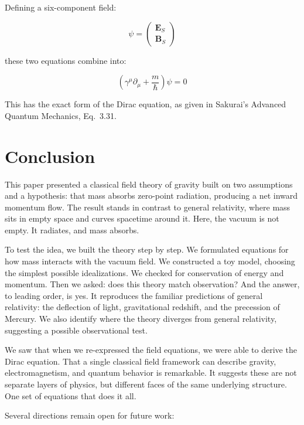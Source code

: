 \documentclass {article}
\renewcommand\vec{\mathbf}
\begin{document}
\noindent Defining a six-component field:

\begin{equation}
\psi = \begin{pmatrix}
\vec{E}_S \\
\vec{B}_S
\end{pmatrix}
\end{equation}

\noindent these two equations combine into:

\begin{equation}
\left( \gamma^\mu \partial_\mu + \frac{m}{\hbar} \right) \psi = 0
\end{equation}

This has the exact form of the Dirac equation, as given in Sakurai's Advanced Quantum Mechanics\cite{sakurai}, Eq.\ 3.31.

\section{Conclusion}

This paper presented a classical field theory of gravity built on two assumptions and a hypothesis: that mass absorbs zero-point radiation, producing a net inward momentum flow. The result stands in contrast to general relativity, where mass sits in empty space and curves spacetime around it. Here, the vacuum is not empty. It radiates, and mass absorbs.

To test the idea, we built the theory step by step. We formulated equations for how mass interacts with the vacuum field. We constructed a toy model, choosing the simplest possible idealizations. We checked for conservation of energy and momentum. Then we asked: does this theory match observation? And the answer, to leading order, is yes. It reproduces the familiar predictions of general relativity: the deflection of light, gravitational redshift, and the precession of Mercury. We also identify where the theory diverges from general relativity, suggesting a possible observational test.

We saw that when we re-expressed the field equations, we were able to derive the Dirac equation. That a single classical field framework can describe gravity, electromagnetism, and quantum behavior is remarkable. It suggests these are not separate layers of physics, but different faces of the same underlying structure. One set of equations that does it all.

Several directions remain open for future work:
\end{document}
